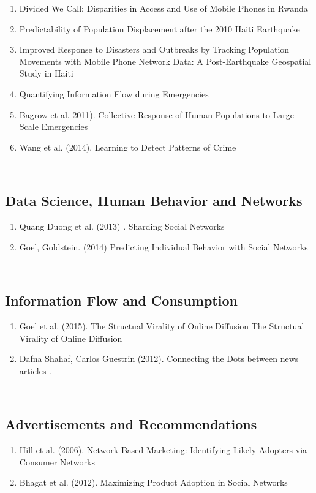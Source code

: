 \begin{enumerate}
\item Divided We Call: Disparities in Access and Use of Mobile Phones in Rwanda
\item Predictability of Population Displacement after the 2010 Haiti Earthquake
\item Improved Response to Disasters and Outbreaks by Tracking Population Movements with Mobile Phone Network Data: A Post-Earthquake Geospatial Study in Haiti
\item Quantifying Information Flow during Emergencies
\item Bagrow et al. 2011). Collective Response of Human Populations to Large-Scale Emergencies \cite{Bagrow_2011}
\item Wang et al. (2014). Learning to Detect Patterns of Crime\cite{Wang_2013}
\end{enumerate}
\\
\subsection{Data Science, Human Behavior and Networks}
\begin{enumerate}
\item Quang Duong et al. (2013) . Sharding Social Networks\cite{Duong_2013}
\item Goel,  Goldstein. (2014) Predicting Individual Behavior with Social Networks \cite{Goel_2014}
\end{enumerate}
\\
\subsection{Information Flow and Consumption}
\begin{enumerate}
\item Goel et al. (2015). The Structual Virality of Online Diffusion The Structual Virality of Online Diffusion\cite{Goel_2015}
\item Dafna Shahaf, Carlos Guestrin (2012). Connecting the Dots between news articles . \cite{Shahaf:2012:CTD:2086737.2086744} 
\end{enumerate}
\\
\subsection{Advertisements and Recommendations}
\begin{enumerate}
\item Hill et al. (2006). Network-Based Marketing: Identifying Likely Adopters via Consumer Networks \cite{Hill_2006}
\item Bhagat et al. (2012). Maximizing Product Adoption in Social Networks\cite{Bhagat:2012:MPA:2124295.2124368}
\end{enumerate}